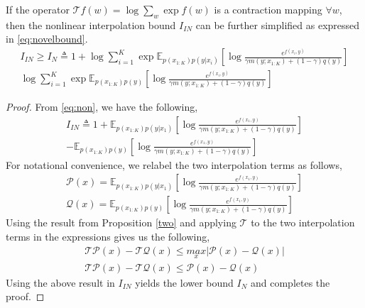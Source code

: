 \documentclass{article}
\begin{document}
\begin{customthm}{3}
  If the operator $\mathcal{T}f(w)=\log \sum_{w} \exp{f(w)}$ is a contraction mapping $\forall w$, then the nonlinear interpolation bound $I_{IN}$ can be further simplified as expressed in \autoref{eq:novelbound}. 
\begin{multline}  
  I_{IN} \geq I_{N} \triangleq 1 + \log \sum_{i=1}^{K} \exp{\mathbb{E}_{p(x_{1:K})p(y|x_{i})}[\log\frac{e^{f(x_{i},y)}}{\gamma m(y;x_{1:K})+(1-\gamma)q(y)}]}\\ \log \sum_{i=1}^{K} \exp{\mathbb{E}_{p(x_{1:K})p(y)}[\log\frac{e^{f(x_{i},y)}}{\gamma m(y;x_{1:K})+(1-\gamma)q(y)}]} \nonumber
\end{multline} 
\end{customthm}
\begin{proof}
  From \autoref{eq:non}, we have the following,
  \begin{multline}  
    I_{IN} \triangleq 1 + \mathbb{E}_{p(x_{1:K})p(y|x_{1})}[\log\frac{e^{f(x_{1},y)}}{\gamma m(y;x_{1:K})+(1-\gamma)q(y)}]\\ - \mathbb{E}_{p(x_{1:K})p(y)}[\log\frac{e^{f(x_{1},y)}}{\gamma m(y;x_{1:K})+(1-\gamma)q(y)}] \nonumber
  \end{multline}  
For notational convenience, we relabel the two interpolation terms as follows,
\begin{gather*}
  \mathcal{P}(x) = \mathbb{E}_{p(x_{1:K})p(y|x_{1})}[\log\frac{e^{f(x_{1},y)}}{\gamma m(y;x_{1:K})+(1-\gamma)q(y)}]\\ \mathcal{Q}(x) = \mathbb{E}_{p(x_{1:K})p(y)}[\log\frac{e^{f(x_{1},y)}}{\gamma m(y;x_{1:K})+(1-\gamma)q(y)}]
\end{gather*}
Using the result from Proposition \autoref{two} and applying $\mathcal{T}$ to the two interpolation terms in the expressions gives us the following,
\begin{gather*}
  \mathcal{T}\mathcal{P}(x) - \mathcal{T}\mathcal{Q}(x) \leq \underset{x}{max}|\mathcal{P}(x) - \mathcal{Q}(x)| \\
  \mathcal{T}\mathcal{P}(x) - \mathcal{T}\mathcal{Q}(x) \leq \mathcal{P}(x) - \mathcal{Q}(x)
\end{gather*}  
Using the above result in $I_{IN}$ yields the lower bound $I_{N}$ and completes the proof.
\end{proof}  
\end{document}
